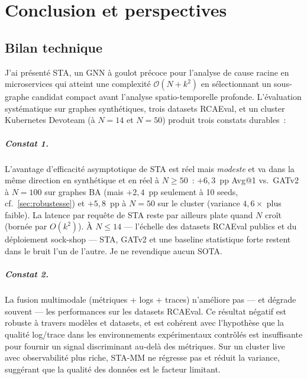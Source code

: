 \documentclass[a4paper,11pt,oneside]{report}
\begin{document}
\chapter{Conclusion et perspectives}
\label{chap:conclusion}

\section{Bilan technique}
\label{sec:concl-bilan}

J'ai pr\'esent\'e STA, un GNN \`a goulot pr\'ecoce pour l'analyse de cause racine en microservices qui atteint une complexit\'e $\mathcal{O}(N + k^2)$ en s\'electionnant un sous-graphe candidat compact avant l'analyse spatio-temporelle profonde. L'\'evaluation syst\'ematique sur graphes synth\'etiques, trois datasets RCAEval, et un cluster Kubernetes Devoteam (\`a $N{=}14$ et $N{=}50$) produit trois constats durables~:

\paragraph{Constat 1.} L'avantage d'efficacit\'e asymptotique de STA est r\'eel mais \emph{modeste} et va dans la m\^eme direction en synth\'etique et en r\'eel \`a $N \ge 50$~: $+6{,}3$~pp Avg@1 vs.\ GATv2 \`a $N{=}100$ sur graphes BA (mais $+2{,}4$~pp seulement \`a 10 seeds, cf.\ \cref{sec:robustesse}) et $+5{,}8$~pp \`a $N{=}50$ sur le cluster (variance $4{,}6\times$ plus faible). La latence par requ\^ete de STA reste par ailleurs plate quand $N$ cro\^it (born\'ee par $O(k^2)$). \`A $N \le 14$ --- l'\'echelle des datasets RCAEval publics et du d\'eploiement sock-shop --- STA, GATv2 et une baseline statistique forte restent dans le bruit l'un de l'autre. Je ne revendique aucun SOTA.

\paragraph{Constat 2.} La fusion multimodale (m\'etriques + logs + traces) n'am\'eliore pas --- et d\'egrade souvent --- les performances sur les datasets RCAEval. Ce r\'esultat n\'egatif est robuste \`a travers mod\`eles et datasets, et est coh\'erent avec l'hypoth\`ese que la qualit\'e log/trace dans les environnements exp\'erimentaux contr\^ol\'es est insuffisante pour fournir un signal discriminant au-del\`a des m\'etriques. Sur un cluster live avec observabilit\'e plus riche, STA-MM ne r\'egresse pas et r\'eduit la variance, sugg\'erant que la qualit\'e des donn\'ees est le facteur limitant.
\end{document}
